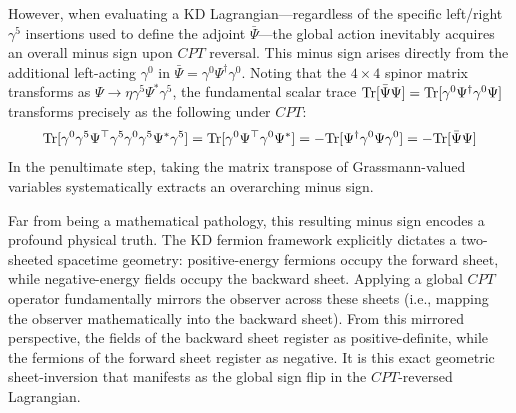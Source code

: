 However, when evaluating a KD Lagrangian—regardless of the specific left/right $\gamma^5$ insertions used to define the adjoint $\bar\Psi$—the global action inevitably acquires an overall minus sign upon $CPT$ reversal. This minus sign arises directly from the additional left-acting $\gamma^0$ in $\bar\Psi=\gamma^0\Psi^\dagger\gamma^0$. Noting that the $4\times 4$ spinor matrix transforms as $\Psi\to \eta \gamma^5\Psi^*\gamma^5$, the fundamental scalar trace ${\rm Tr}[\bar\Psi\Psi]={\rm Tr}[\gamma^0\Psi^\dagger\gamma^0\Psi]$ transforms precisely as the following under $CPT$: 
\[{\rm Tr}[\gamma^0\gamma^5\Psi^\top \gamma^5\gamma^0\gamma^5\Psi^*\gamma^5]= {\rm Tr}[\gamma^0\Psi^\top \gamma^0\Psi^*]=-{\rm Tr}[\Psi^\dagger \gamma^0\Psi\gamma^0]=-{\rm Tr}[\bar\Psi\Psi]\]
In the penultimate step, taking the matrix transpose of Grassmann-valued variables systematically extracts an overarching minus sign.

Far from being a mathematical pathology, this resulting minus sign encodes a profound physical truth. The KD fermion framework explicitly dictates a two-sheeted spacetime geometry: positive-energy fermions occupy the forward sheet, while negative-energy fields occupy the backward sheet. Applying a global $CPT$ operator fundamentally mirrors the observer across these sheets (i.e., mapping the observer mathematically into the backward sheet). From this mirrored perspective, the fields of the backward sheet register as positive-definite, while the fermions of the forward sheet register as negative. It is this exact geometric sheet-inversion that manifests as the global sign flip in the $CPT$-reversed Lagrangian.

